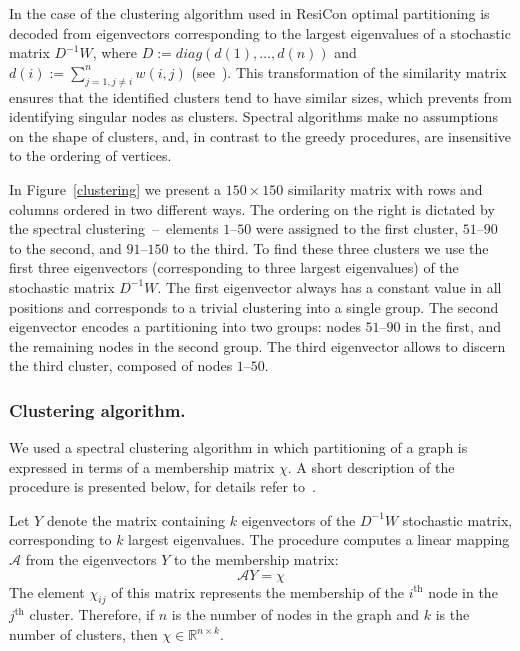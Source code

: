 \documentclass[a4paper,11pt,twoside]{book}%
\begin{document}
In the case of the clustering algorithm used in ResiCon optimal partitioning is decoded from eigenvectors corresponding to the largest eigenvalues of a stochastic matrix $D^{-1}W$, where $D:=diag(d(1),\ldots,d(n))$ and $d(i):=\sum_{j=1,j\neq i}^{n} w(i,j)$ (see~\cite{weber2004perron}).
This transformation of the similarity matrix ensures that the identified clusters tend to have similar sizes, which prevents from identifying singular nodes as clusters.
Spectral algorithms make no assumptions on the shape of clusters, and, in contrast to the greedy procedures, are insensitive to the ordering of vertices.

In Figure~\ref{clustering} we present a $150\times 150$ similarity matrix with rows and columns ordered in two different ways.
The ordering on the right is dictated by the spectral clustering~--~elements $1\text{--}50$ were assigned to the first cluster, $51\text{--}90$ to the second, and $91\text{--}150$ to the third.
To find these three clusters we use the first three eigenvectors (corresponding to three largest eigenvalues) of the stochastic matrix $D^{-1}W$.
The first eigenvector always has a constant value in all positions and corresponds to a trivial clustering into a single group.
The second eigenvector encodes a partitioning into two groups: nodes $51\text{--}90$ in the first, and the remaining nodes in the second group.
The third eigenvector allows to discern the third cluster, composed of nodes $1\text{--}50$.

\subsubsection*{Clustering algorithm.}
We used a spectral clustering algorithm in which partitioning of a graph is expressed in terms of a membership matrix $\chi$.
A short description of the procedure is presented below, for details refer to~\cite{weber2004perron}.

Let $Y$ denote the matrix containing $k$ eigenvectors of the $D^{-1}W$ stochastic matrix, corresponding to $k$ largest eigenvalues.
The procedure computes a linear mapping $\mathcal{A}$ from the eigenvectors $Y$ to the membership matrix:
\begin{displaymath}
\mathcal{A} Y = \chi
\end{displaymath}
The element $\chi_{ij}$ of this matrix represents the membership of the $i^{\textrm{th}}$ node in the $j^{\textrm{th}}$ cluster.
Therefore, if $n$ is the number of nodes in the graph and $k$ is the number of clusters, then $\chi\in\mathbb{R}^{n\times k}$.
\end{document}
